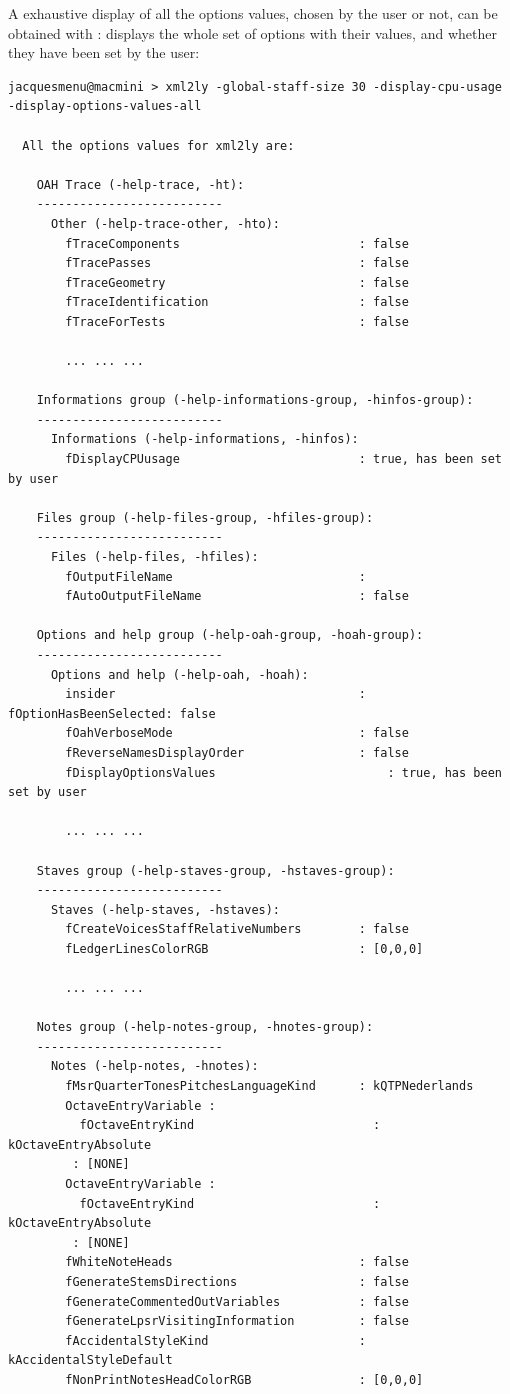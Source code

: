 A exhaustive display of all the options values, chosen by the user or not, can be obtained with :
displays the whole set of options with their values, and whether they have been set by the user:
\begin{lstlisting}[language=Terminal]
jacquesmenu@macmini > xml2ly -global-staff-size 30 -display-cpu-usage -display-options-values-all

  All the options values for xml2ly are:

    OAH Trace (-help-trace, -ht):
    --------------------------
      Other (-help-trace-other, -hto):
        fTraceComponents                         : false
        fTracePasses                             : false
        fTraceGeometry                           : false
        fTraceIdentification                     : false
        fTraceForTests                           : false

		... ... ...

    Informations group (-help-informations-group, -hinfos-group):
    --------------------------
      Informations (-help-informations, -hinfos):
        fDisplayCPUusage                         : true, has been set by user

    Files group (-help-files-group, -hfiles-group):
    --------------------------
      Files (-help-files, -hfiles):
        fOutputFileName                          :
        fAutoOutputFileName                      : false

    Options and help group (-help-oah-group, -hoah-group):
    --------------------------
      Options and help (-help-oah, -hoah):
        insider                                  : fOptionHasBeenSelected: false
        fOahVerboseMode                          : false
        fReverseNamesDisplayOrder                : false
        fDisplayOptionsValues                        : true, has been set by user

		... ... ...

    Staves group (-help-staves-group, -hstaves-group):
    --------------------------
      Staves (-help-staves, -hstaves):
        fCreateVoicesStaffRelativeNumbers        : false
        fLedgerLinesColorRGB                     : [0,0,0]

		... ... ...

    Notes group (-help-notes-group, -hnotes-group):
    --------------------------
      Notes (-help-notes, -hnotes):
        fMsrQuarterTonesPitchesLanguageKind      : kQTPNederlands
        OctaveEntryVariable :
          fOctaveEntryKind                         : kOctaveEntryAbsolute
         : [NONE]
        OctaveEntryVariable :
          fOctaveEntryKind                         : kOctaveEntryAbsolute
         : [NONE]
        fWhiteNoteHeads                          : false
        fGenerateStemsDirections                 : false
        fGenerateCommentedOutVariables           : false
        fGenerateLpsrVisitingInformation         : false
        fAccidentalStyleKind                     : kAccidentalStyleDefault
        fNonPrintNotesHeadColorRGB               : [0,0,0]


\end{lstlisting}
